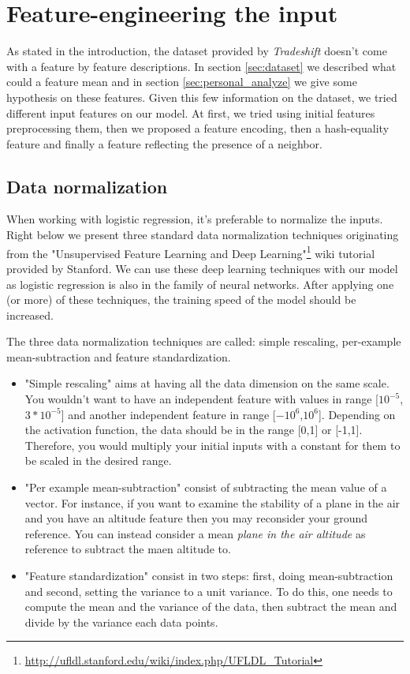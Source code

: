 
\section{Feature-engineering the input}
\label{sec:preprocessing}

	As stated in the introduction, the dataset provided by \textit{Tradeshift} doesn't come with a feature by feature descriptions. In section \ref{sec:dataset} we described what could a feature mean and in section \ref{sec:personal_analyze} we give some hypothesis on these features. Given this few information on the dataset, we tried different input features on our model. At first, we tried using initial features preprocessing them, then we proposed a feature encoding, then a hash-equality feature and finally a feature reflecting the presence of a neighbor.

	\subsection{Data normalization}

		When working with logistic regression, it's preferable to normalize the inputs. Right below we present three standard data normalization techniques originating from the "Unsupervised Feature Learning and Deep Learning"\footnote{\url{http://ufldl.stanford.edu/wiki/index.php/UFLDL_Tutorial}} wiki tutorial provided by Stanford. We can use these deep learning techniques with our model as logistic regression is also in the family of neural networks. After applying one (or more) of these techniques, the training speed of the model should be increased.

		The three data normalization techniques are called: simple rescaling, per-example mean-subtraction and feature standardization.\\
		\begin{itemize}
			\item "Simple rescaling" aims at having all the data dimension on the same scale. You wouldn't want to have an independent feature with values in range [$10^{-5}$,$3*10^{-5}$] and another independent feature in range [$-10^{6}$,$10^{6}$]. Depending on the activation function, the data should be in the range [0,1] or [-1,1]. Therefore, you would multiply your initial inputs with a constant for them to be scaled in the desired range.
			\item "Per example mean-subtraction" consist of subtracting the mean value of a vector. For instance, if you want to examine the stability of a plane in the air and you have an altitude feature then you may reconsider your ground reference. You can instead consider a mean \textit{plane in the air altitude} as reference to subtract the maen altitude to.
			\item "Feature standardization" consist in two steps: first, doing mean-subtraction and second, setting the variance to a unit variance. To do this, one needs to compute the mean and the variance of the data, then subtract the mean and divide by the variance each data points.
		\end{itemize}

